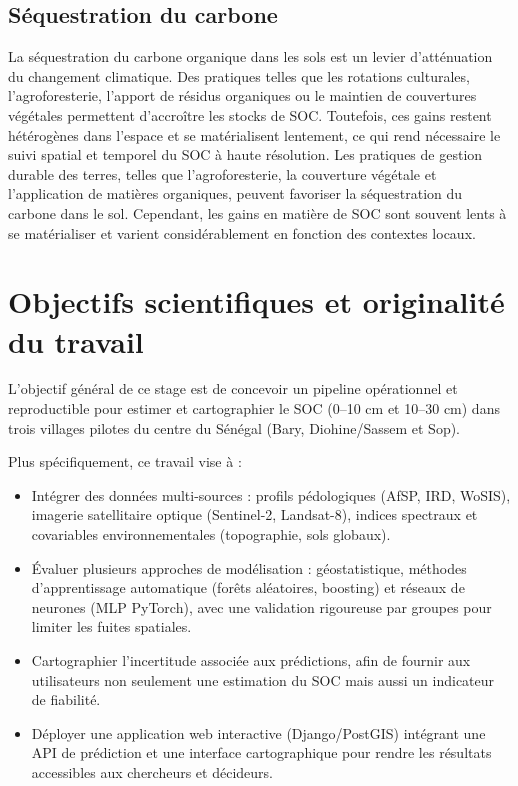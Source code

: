 \documentclass[12pt,a4paper,oneside]{report}
\begin{document}
\subsection{Séquestration du carbone}
La séquestration \cite{lal_soil_2004} du carbone organique dans les sols est un levier d’atténuation du changement climatique. Des pratiques telles que les rotations culturales, l’agroforesterie, l’apport de résidus organiques ou le maintien de couvertures végétales permettent d’accroître les stocks de SOC. Toutefois, ces gains restent hétérogènes dans l’espace et se matérialisent lentement, ce qui rend nécessaire le suivi spatial et temporel du SOC à haute résolution.
Les pratiques de gestion durable des terres, telles que l'agroforesterie, la couverture végétale et l'application de matières organiques, peuvent favoriser la séquestration du carbone dans le sol. Cependant, les gains en matière de SOC sont souvent lents à se matérialiser et varient considérablement en fonction des contextes locaux.


\section{Objectifs scientifiques et originalité du travail}

L’objectif général de ce stage est de concevoir un pipeline opérationnel et reproductible pour estimer et cartographier le SOC (0–10 cm et 10–30 cm) dans trois villages pilotes du centre du Sénégal (Bary, Diohine/Sassem et Sop).

Plus spécifiquement, ce travail vise à :
\begin{itemize}


\item Intégrer des données multi-sources : profils pédologiques (AfSP, IRD, WoSIS), imagerie satellitaire optique (Sentinel-2, Landsat-8), indices spectraux et covariables environnementales (topographie, sols globaux).

\item Évaluer plusieurs approches de modélisation : géostatistique, méthodes d’apprentissage automatique (forêts aléatoires, boosting) et réseaux de neurones (MLP PyTorch), avec une validation rigoureuse par groupes pour limiter les fuites spatiales.

\item Cartographier l’incertitude associée aux prédictions, afin de fournir aux utilisateurs non seulement une estimation du SOC mais aussi un indicateur de fiabilité.

\item Déployer une application web interactive (Django/PostGIS) intégrant une API de prédiction et une interface cartographique pour rendre les résultats accessibles aux chercheurs et décideurs.
\end{itemize}
\end{document}
